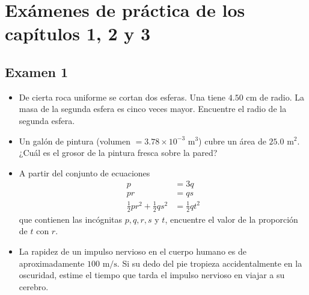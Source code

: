\documentclass[11pt,a4paper]{article}
\begin{document}
\section*{Exámenes de práctica de los capítulos 1, 2 y 3}

\subsection*{Examen 1}

\begin{itemize}
    \item[\textbf{1.}] De cierta roca uniforme se cortan dos esferas. Una tiene $4.50 \text{ cm}$ de radio. La masa de la segunda esfera es cinco veces mayor. Encuentre el radio de la segunda esfera.
    \vspace*{6cm}

    \item[\textbf{2.}] Un galón de pintura (volumen $= 3.78 \times 10^{-3} \text{ m}^3$) cubre un área de $25.0 \text{ m}^2$. ¿Cuál es el grosor de la pintura fresca sobre la pared?
    \vspace*{6cm}

    \item[\textbf{3.}] A partir del conjunto de ecuaciones
    \begin{align*}
        p &= 3q \\
        pr &= qs \\
        \frac{1}{2}pr^2 + \frac{1}{2}qs^2 &= \frac{1}{2}qt^2
    \end{align*}
    que contienen las incógnitas $p, q, r, s$ y $t$, encuentre el valor de la proporción de $t$ con $r$.
    \vspace*{7cm}

    \item[\textbf{4.}] La rapidez de un impulso nervioso en el cuerpo humano es de aproximadamente $100 \text{ m/s}$. Si su dedo del pie tropieza accidentalmente en la oscuridad, estime el tiempo que tarda el impulso nervioso en viajar a su cerebro.
    \vspace*{5cm}
\end{itemize}

\newpage
\end{document}
